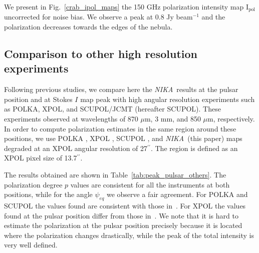 \documentclass[twocolumn,traditabstract]{aa}
\def\NIKA{\textit{NIKA}}
\begin{document}
We present in Fig.~\ref{crab_ipol_maps} the 150 GHz  polarization intensity
map ${\textrm{I}_{\textrm{pol}}}$ uncorrected for noise bias. We observe a peak at 0.8 Jy beam$^{-1}$ and the polarization
decreases towards the edges of the nebula. 

\subsection{Comparison to other high resolution experiments}
Following previous studies, we compare here the \NIKA\ results at the pulsar position and at Stokes $I$ map peak with high angular resolution experiments such as POLKA, XPOL, and SCUPOL/JCMT (hereafter SCUPOL). These experiments observed at wavelengths of 870 $\mu$m, 3 mm, and 850 $\mu$m, respectively.
In order to compute polarization estimates in the same region around these positions, we use POLKA \citep{2014PASP..126.1027W}, XPOL \citep{aumont2010}, SCUPOL \citep{scubapol}, and \NIKA\ (this paper) maps degraded at an XPOL angular resolution of 27$^{\prime\prime}$. The region is defined as an XPOL pixel size of 13.7$^{\prime\prime}$.

The results obtained are shown in Table~\ref{tab:peak_pulsar_others}. The polarization degree $p$ values are consistent for all the instruments at both positions, while for the angle $\psi_{eq}$ we observe a fair agreement. For POLKA and SCUPOL the values found are consistent with those in~\citet{2014PASP..126.1027W}.
For XPOL the values found at the pulsar position differ from those in~\citet{aumont2010}. We note that it is hard to estimate  the polarization at the pulsar position precisely because it is located where the polarization changes drastically, while the peak of the total intensity is very well defined. 
\end{document}
